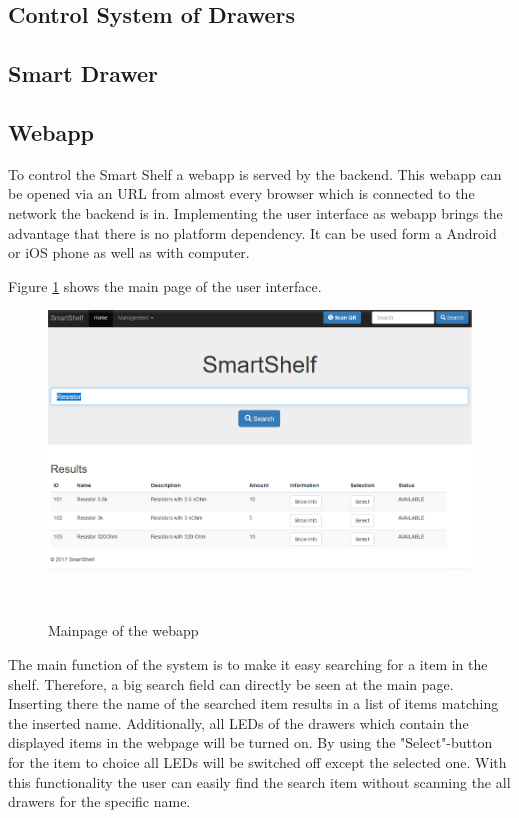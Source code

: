 \subsection{Control System of Drawers}

\subsection{Smart Drawer}

\subsection{Webapp}
To control the Smart Shelf a webapp is served by the backend. 
This webapp can be opened via an URL from almost every browser which is connected to the network the backend is in. 
Implementing the user interface as webapp brings the advantage that there is no platform dependency. 
It can be used form a Android or iOS phone as well as with computer. 

Figure \ref{fig:webapp-mainpage} shows the main page of the user interface. 
%
\begin{figure}
	\centering
	\includegraphics[width=1.3\columnwidth]{figures/ui-mainpage.png}
	\caption{Mainpage of the webapp}~\label{fig:webapp-mainpage}
\end{figure}
%
The main function of the system is to make it easy searching for a item in the shelf. 
Therefore, a big search field can directly be seen at the main page. 
Inserting there the name of the searched item results in a list of items matching the inserted name. 
Additionally, all LEDs of the drawers which contain the displayed items in the webpage will be turned on. 
By using the "Select"-button for the item to choice all LEDs will be switched off except the selected one. 
With this functionality the user can easily find the search item without scanning the all drawers for the specific name. 

